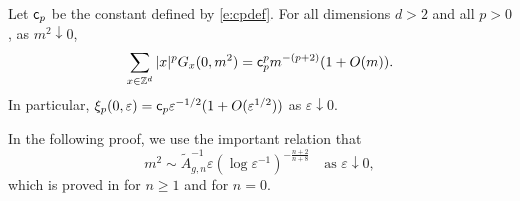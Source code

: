 \begin{prop}\label{prop:Gab-free-moment-estimate}
Let ${\sf c}_p$ be the constant defined by \eqref{e:cpdef}.
For all dimensions $d>2$ and all $p>0$,
as $m^2 \downarrow 0$,
\begin{equation}
\label{e:Gab-free-moment-estimate}
\sum_{x\in{ {{\mathbb Z}}^d }} |x|^p G_{x}(0, m^2)
=
{\sf c}_p^p m^{-(p + 2)} (1 + O(m)).
\end{equation}
In particular, $\xi_p(0,\varepsilon) = {\sf c}_p \varepsilon^{-1/2}
(1+O(\varepsilon^{1/2}))$ as $\varepsilon \downarrow 0$.
\end{prop}

In the following proof, we use the important relation that
\begin{equation}
\label{e:mass-epsilon-asympt}
m^2
	\sim
\tilde A_{g,n}^{-1} \varepsilon (\log \varepsilon^{-1})^{-\frac{n + 2}{n + 8}}
	\quad
\text{as $\varepsilon \downarrow 0$},
\end{equation}
which is proved in \cite[\eqref{phi4-log-e:masymp}]{BBS-phi4-log} for $n\geq 1$
and \cite[\eqref{log-e:m-mu}]{BBS-saw4-log} for $n=0$.

